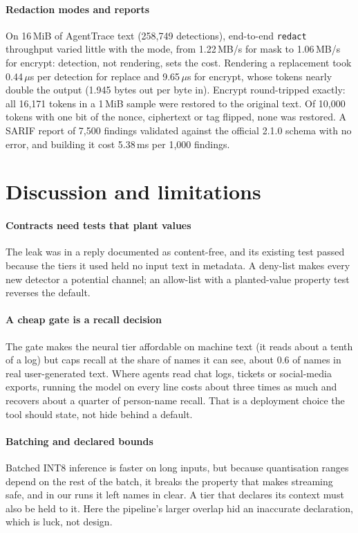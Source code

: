 \documentclass[conference]{IEEEtran}
\begin{document}
\paragraph{Redaction modes and reports} On 16\,MiB of AgentTrace text (258,749 detections), end-to-end \texttt{redact} throughput varied little with the mode, from 1.22\,MB/s for mask to 1.06\,MB/s for encrypt: detection, not rendering, sets the cost. Rendering a replacement took 0.44\,$\mu$s per detection for replace and 9.65\,$\mu$s for encrypt, whose tokens nearly double the output (1.945 bytes out per byte in). Encrypt round-tripped exactly: all 16,171 tokens in a 1\,MiB sample were restored to the original text. Of 10,000 tokens with one bit of the nonce, ciphertext or tag flipped, none was restored. A SARIF report of 7,500 findings validated against the official 2.1.0 schema with no error, and building it cost 5.38\,ms per 1,000 findings.

\section{Discussion and limitations}\label{sec:discussion}

\paragraph{Contracts need tests that plant values} The leak was in a reply documented as content-free, and its existing test passed because the tiers it used held no input text in metadata. A deny-list makes every new detector a potential channel; an allow-list with a planted-value property test reverses the default.

\paragraph{A cheap gate is a recall decision} The gate makes the neural tier affordable on machine text (it reads about a tenth of a log) but caps recall at the share of names it can see, about 0.6 of names in real user-generated text. Where agents read chat logs, tickets or social-media exports, running the model on every line costs about three times as much and recovers about a quarter of person-name recall. That is a deployment choice the tool should state, not hide behind a default.

\paragraph{Batching and declared bounds} Batched INT8 inference is faster on long inputs, but because quantisation ranges depend on the rest of the batch, it breaks the property that makes streaming safe, and in our runs it left names in clear. A tier that declares its context must also be held to it. Here the pipeline's larger overlap hid an inaccurate declaration, which is luck, not design.
\end{document}
